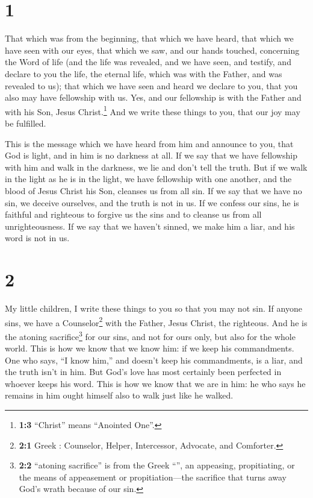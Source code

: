 \hypertarget{section}{%
\section{1}\label{section}}

 That which was from the beginning, that which we have
heard, that which we have seen with our eyes, that which we saw, and our
hands touched, concerning the Word of life  (and the life
was revealed, and we have seen, and testify, and declare to you the
life, the eternal life, which was with the Father, and was revealed to
us);  that which we have seen and heard we declare to you,
that you also may have fellowship with us. Yes, and our fellowship is
with the Father and with his Son, Jesus Christ.\footnote{\textbf{1:3}
  ``Christ'' means ``Anointed One''.}  And we write these
things to you, that our joy may be fulfilled.

 This is the message which we have heard from him and
announce to you, that God is light, and in him is no darkness at all.
 If we say that we have fellowship with him and walk in
the darkness, we lie and don't tell the truth.  But if we
walk in the light as he is in the light, we have fellowship with one
another, and the blood of Jesus Christ his Son, cleanses us from all
sin.  If we say that we have no sin, we deceive ourselves,
and the truth is not in us.  If we confess our sins, he is
faithful and righteous to forgive us the sins and to cleanse us from all
unrighteousness.  If we say that we haven't sinned, we
make him a liar, and his word is not in us.

\hypertarget{section-1}{%
\section{2}\label{section-1}}

 My little children, I write these things to you so that
you may not sin. If anyone sins, we have a Counselor\footnote{\textbf{2:1}
  Greek : Counselor, Helper, Intercessor, Advocate,
  and Comforter.} with the Father, Jesus Christ, the righteous.
 And he is the atoning sacrifice\footnote{\textbf{2:2}
  ``atoning sacrifice'' is from the Greek ``'', an
  appeasing, propitiating, or the means of appeasement or
  propitiation---the sacrifice that turns away God's wrath because of
  our sin.} for our sins, and not for ours only, but also for the whole
world.  This is how we know that we know him: if we keep
his commandments.  One who says, ``I know him,'' and
doesn't keep his commandments, is a liar, and the truth isn't in him.
 But God's love has most certainly been perfected in
whoever keeps his word. This is how we know that we are in him:
 he who says he remains in him ought himself also to walk
just like he walked.

